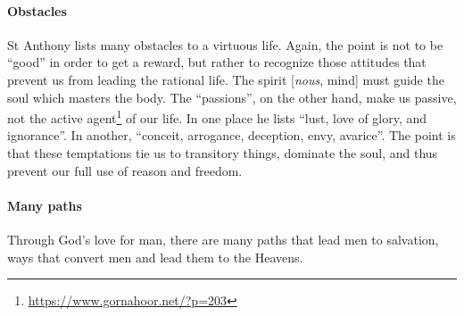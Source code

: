 \paragraph{Obstacles}
St Anthony lists many obstacles to a virtuous life. Again, the point is not to be “good” in order to get a reward, but
rather to recognize those attitudes that prevent us from leading the rational life. The spirit [\emph{nous}, mind] must
guide the soul which masters the body. The “passions”, on the other hand, make us passive, not the active agent\footnote{\url{https://www.gornahoor.net/?p=203}} of our
life. In one place he lists “lust, love of glory, and ignorance”. In another, “conceit, arrogance, deception, envy,
avarice”. The point is that these temptations tie us to transitory things, dominate the soul, and thus prevent our full
use of reason and freedom.

\paragraph{Many paths}
\begin{quotex}
Through God's love for man, there are many paths that lead men to salvation, ways that convert men and lead
them to the Heavens. 

\end{quotex}

